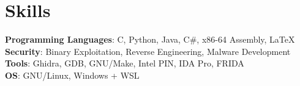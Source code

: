 \documentclass[a4paper,10pt]{article}
\begin{document}
\section{Skills}
\begin{itemize}[leftmargin=0.15in, label={}]
    \normalsize{\item{
     \textbf{Programming Languages}{: C, Python, Java, C\#, x86-64 Assembly, LaTeX} \\
     \textbf{Security}{: Binary Exploitation, Reverse Engineering, Malware Development}\\
     \textbf{Tools}{: Ghidra, GDB, GNU/Make, Intel PIN, IDA Pro, FRIDA} \\
     \textbf{OS}{: GNU/Linux, Windows + WSL} \\
    }}
 \end{itemize}

\end{document}
